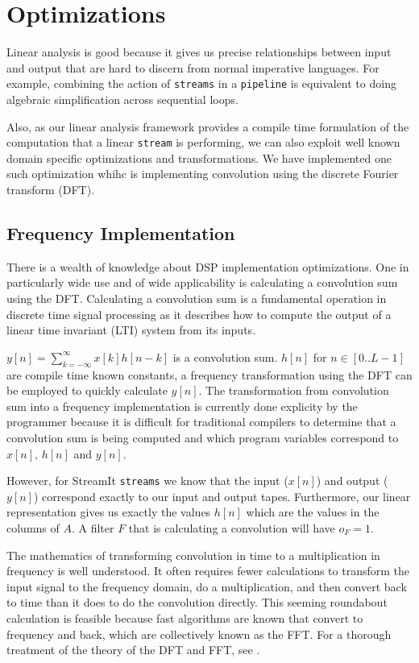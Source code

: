 \section{Optimizations}
Linear analysis is good because it gives us precise relationships between input and output   
that are hard to discern from normal imperative languages. For example, combining the action
of {\tt streams} in a {\tt pipeline} is equivalent to doing algebraic simplification across
sequential loops. 

Also, as our linear analysis framework provides a compile time formulation of the 
computation that a linear {\tt stream} is performing, we can also exploit well known 
domain specific optimizations and transformations. We have implemented one such optimization
whihc is implementing convolution using the discrete Fourier transform (DFT). 


\subsection{Frequency Implementation}
There is a wealth of knowledge about DSP implementation optimizations. One in
particularly wide use and of wide applicability is calculating a convolution sum 
using the DFT. Calculating a convolution sum is a fundamental
operation in discrete time signal processing as it describes how to compute the
output of a linear time invariant (LTI) system from its inputs\cite{oppenheim-discrete}.

$y[n]=\sum_{k=-\infty}^{\infty}x[k]h[n-k]$ is a convolution sum. 
$h[n]$ for $n\in[0..L-1]$ are compile time known constants, a frequency transformation
using the DFT can be employed to quickly calculate $y[n]$. 
The transformation from convolution sum into a frequency implementation is currently
done explicity by the programmer because it is difficult for traditional compilers 
to determine that a convolution sum is being computed and which program variables
correspond to $x[n]$, $h[n]$ and $y[n]$.

However, for StreamIt {\tt streams} we know that the input ($x[n]$) and output ($y[n]$)
correspond exactly to our input and output tapes. Furthermore, our linear representation
gives us exactly the values $h[n]$ which are the values in the columns of $A$. A filter
$F$ that is calculating a convolution will have $o_F=1$.

The mathematics of transforming convolution in time to a multiplication in frequency 
is well understood. It often requires fewer calculations to transform
the input signal to the frequency domain, do a multiplication, and then convert back 
to time than it does to do the convolution directly. This seeming roundabout calculation
is feasible because fast algorithms are known that convert to frequency and back,
which are collectively known as the FFT. For a thorough treatment of the theory of
the DFT and FFT, see \cite{oppenheim-discrete}.


